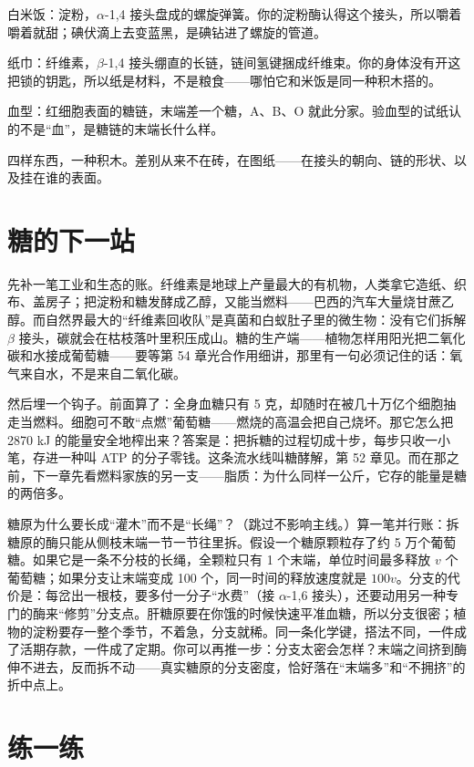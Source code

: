 白米饭：淀粉，$\alpha$-1,4 接头盘成的螺旋弹簧。你的淀粉酶认得这个接头，所以嚼着嚼着就甜；碘伏滴上去变蓝黑，是碘钻进了螺旋的管道。

纸巾：纤维素，$\beta$-1,4 接头绷直的长链，链间氢键捆成纤维束。你的身体没有开这把锁的钥匙，所以纸是材料，不是粮食——哪怕它和米饭是同一种积木搭的。

血型：红细胞表面的糖链，末端差一个糖，A、B、O 就此分家。验血型的试纸认的不是“血”，是糖链的末端长什么样。

四样东西，一种积木。差别从来不在砖，在图纸——在接头的朝向、链的形状、以及挂在谁的表面。

\section{糖的下一站}

先补一笔工业和生态的账。纤维素是地球上产量最大的有机物，人类拿它造纸、织布、盖房子；把淀粉和糖发酵成乙醇，又能当燃料——巴西的汽车大量烧甘蔗乙醇。而自然界最大的“纤维素回收队”是真菌和白蚁肚子里的微生物：没有它们拆解 $\beta$ 接头，碳就会在枯枝落叶里积压成山。糖的生产端——植物怎样用阳光把二氧化碳和水接成葡萄糖——要等第 54 章光合作用细讲，那里有一句必须记住的话：氧气来自水，不是来自二氧化碳。

然后埋一个钩子。前面算了：全身血糖只有 5 克，却随时在被几十万亿个细胞抽走当燃料。细胞可不敢“点燃”葡萄糖——燃烧的高温会把自己烧坏。那它怎么把 2870 kJ 的能量安全地榨出来？答案是：把拆糖的过程切成十步，每步只收一小笔，存进一种叫 ATP 的分子零钱。这条流水线叫糖酵解，第 52 章见。而在那之前，下一章先看燃料家族的另一支——脂质：为什么同样一公斤，它存的能量是糖的两倍多。

\begin{tiaozhan}
糖原为什么要长成“灌木”而不是“长绳”？（跳过不影响主线。）算一笔并行账：拆糖原的酶只能从侧枝末端一节一节往里拆。假设一个糖原颗粒存了约 5 万个葡萄糖。如果它是一条不分枝的长绳，全颗粒只有 1 个末端，单位时间最多释放 $v$ 个葡萄糖；如果分支让末端变成 100 个，同一时间的释放速度就是 $100v$。分支的代价是：每岔出一根枝，要多付一分子“水费”（接 $\alpha$-1,6 接头），还要动用另一种专门的酶来“修剪”分支点。肝糖原要在你饿的时候快速平准血糖，所以分支很密；植物的淀粉要存一整个季节，不着急，分支就稀。同一条化学键，搭法不同，一件成了活期存款，一件成了定期。你可以再推一步：分支太密会怎样？末端之间挤到酶伸不进去，反而拆不动——真实糖原的分支密度，恰好落在“末端多”和“不拥挤”的折中点上。
\end{tiaozhan}

\section*{练一练}

